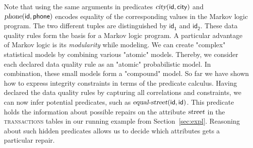 Note that using the same arguments in predicates $\mathsf{\textsl{city}(id, city)}$ and $\mathsf{\textsl{phone}(id, phone)}$ encodes equality of the corresponding values in the Markov logic program. The two different tuples are distinguished by $\mathsf{id_1}$ and $\mathsf{id_2}$. 
These data quality rules form the basis for a Markov logic program. A particular advantage of Markov logic is its \textit{modularity} while modeling. We can create "complex" statistical models by combining various "atomic" models. Thereby, we consider each declared data quality rule as an "atomic" probabilistic model. In combination, these small models form a "compound" model. So far we have shown how to express integrity constraints in terms of the predicate calculus.
Having declared the data quality rules by capturing all correlations and constraints, we can now infer potential predicates, such as $\mathsf{\textsl{equal-street}(id, id)}$. This predicate holds the information about possible repairs on the attribute $\mathsf{\textsl{street}}$ in the \textsc{transactions} tables in our running example from Section~\ref{sec:expl}. Reasoning about such hidden predicates allows us to decide which attributes gets a particular repair. 

